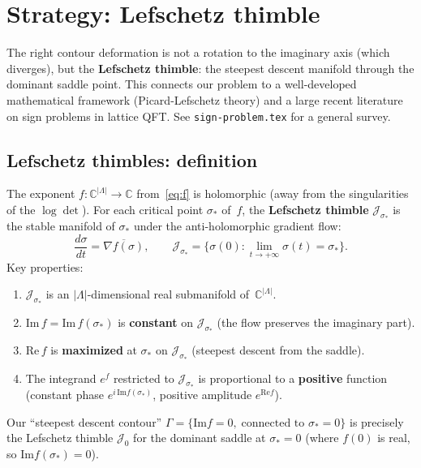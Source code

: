 \documentclass[12pt]{article}
\theoremstyle{definition}
\theoremstyle{remark}
\newcommand{\C}{\mathbb{C}}
\newcommand{\La}{\Lambda}
\newcommand{\im}{\mathrm{Im}}
\newcommand{\re}{\mathrm{Re}}
\begin{document}
\section{Strategy: Lefschetz thimble}\label{sec:thimble}

The right contour deformation is not a rotation to the imaginary
axis (which diverges), but the \textbf{Lefschetz thimble}: the
steepest descent manifold through the dominant saddle point.
This connects our problem to a well-developed mathematical
framework (Picard-Lefschetz theory) and a large recent literature
on sign problems in lattice QFT. See \texttt{sign-problem.tex}
for a general survey.

\subsection{Lefschetz thimbles: definition}

The exponent $f : \C^{|\La|} \to \C$ from~\eqref{eq:f} is
holomorphic (away from the singularities of the $\log\det$).
For each critical point $\sigma_*$ of~$f$, the
\textbf{Lefschetz thimble} $\mathcal{J}_{\sigma_*}$ is the
stable manifold of $\sigma_*$ under the anti-holomorphic
gradient flow:
\begin{equation}\label{eq:flow}
  \frac{d\sigma}{dt} = \overline{\nabla f(\sigma)}, \qquad
  \mathcal{J}_{\sigma_*} = \bigl\{\sigma(0) :
    \lim_{t\to+\infty}\sigma(t) = \sigma_*\bigr\}.
\end{equation}
Key properties:
\begin{enumerate}
\item $\mathcal{J}_{\sigma_*}$ is an $|\La|$-dimensional real
  submanifold of~$\C^{|\La|}$.
\item $\im\,f = \im\,f(\sigma_*)$ is \textbf{constant} on
  $\mathcal{J}_{\sigma_*}$ (the flow preserves the imaginary part).
\item $\re\,f$ is \textbf{maximized} at $\sigma_*$ on
  $\mathcal{J}_{\sigma_*}$ (steepest descent from the saddle).
\item The integrand $e^f$ restricted to $\mathcal{J}_{\sigma_*}$
  is proportional to a \textbf{positive} function (constant
  phase $e^{i\,\im f(\sigma_*)}$, positive amplitude
  $e^{\re f}$).
\end{enumerate}
Our ``steepest descent contour'' $\Gamma = \{\im f = 0,\;
\text{connected to } \sigma_* = 0\}$ is precisely the Lefschetz
thimble $\mathcal{J}_0$ for the dominant saddle at
$\sigma_* = 0$ (where $f(0)$ is real, so $\im f(\sigma_*) = 0$).
\end{document}
